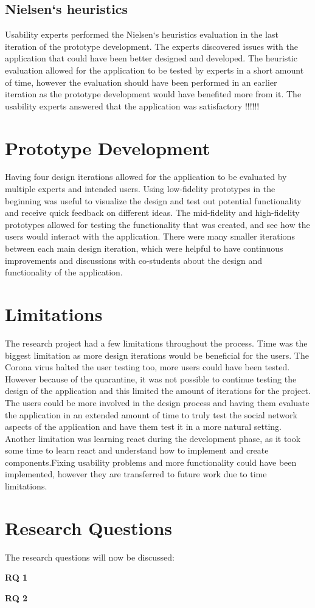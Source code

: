 \subsection{Nielsen`s heuristics}
Usability experts performed the Nielsen`s heuristics evaluation in the last iteration of the prototype development.  The experts discovered issues with the application that could have been better designed and developed.  The heuristic evaluation allowed for the application to be tested by experts in a short amount of time, however the evaluation should have been performed in an earlier iteration as the prototype development would have benefited more from it. The usability experts answered that the application was satisfactory  !!!!!!
\section{Prototype Development}
Having four design iterations allowed for the application to be evaluated by multiple experts and intended users. Using low-fidelity prototypes in the beginning was useful to visualize the design and test out potential functionality and receive quick feedback on different ideas. The mid-fidelity and high-fidelity prototypes allowed for testing the functionality that was created, and see how the users would interact with the application. There were many smaller iterations between each main design iteration, which were helpful to have continuous improvements and discussions with co-students about the design and functionality of the application. 

\section{Limitations}
The research project had a few limitations throughout the process. Time was the biggest limitation as more design iterations would be beneficial for the users. The Corona virus halted the user testing too, more users could have been tested. However because of the quarantine, it was not possible to continue testing the design of the application and this limited the amount of iterations for the project.  The users could be more involved in the design process and having them evaluate the application in an extended amount of time to truly test the social network aspects of the application and have them test it in a more natural setting. Another limitation was learning react during the development phase, as it took some time to learn react and understand how to implement and create components.Fixing usability problems and more functionality could have been implemented,  however they are transferred to future work due to time limitations. 

\section{Research Questions} \label{researchQ}
The research questions will now be discussed:

\textbf{RQ 1}


\textbf{RQ 2}
